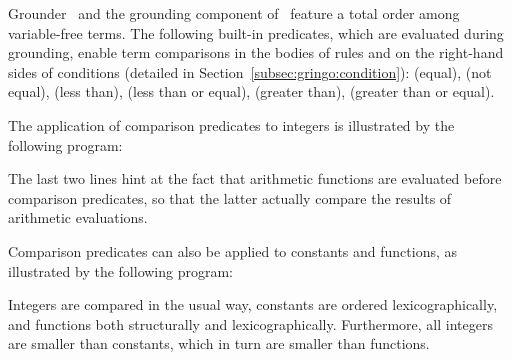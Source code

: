 Grounder \gringo\ and the grounding component of \clingo\ 
feature a total order among variable-free terms.
The following built-in predicates, which are evaluated during grounding, 
enable term comparisons in the bodies of rules and on the right-hand sides of conditions
(detailed in Section~\ref{subsec:gringo:condition}):
\code{==} (equal),
\code{!=} (not equal),
\code{<} (less than),
\code{<=} (less than or equal),
\code{>} (greater than),
\code{>=} (greater than or equal).

\begin{example}\label{ex:arith:pred}
The application of comparison predicates to integers
is illustrated by the following program:%
%

%
The last two lines hint at the fact that arithmetic functions are evaluated
before comparison predicates, so that the latter actually compare the
results of arithmetic evaluations.
\eexample
\end{example}

\begin{example}\label{ex:symb:pred}
Comparison predicates can also be applied to constants and functions,
as illustrated by the following program:%
%

%
Integers are compared in the usual way, constants are ordered lexicographically,
and functions both structurally and lexicographically.
Furthermore, all integers are smaller than constants,
which in turn are smaller than functions.
\eexample
\end{example}

